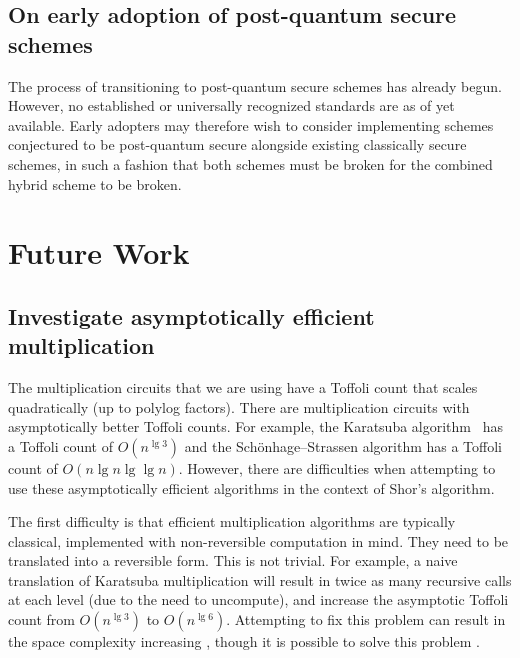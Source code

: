 \documentclass[superscriptaddress,notitlepage,longbibliography]{revtex4-1}
\theoremstyle{definition}
\theoremstyle{definition}
\begin{document}
\subsection{On early adoption of post-quantum secure schemes}
The process of transitioning to post-quantum secure schemes has already begun.
However, no established or universally recognized standards are as of yet available.
Early adopters may therefore wish to consider implementing schemes conjectured to be post-quantum secure  alongside existing classically secure schemes, in such a fashion that both schemes must be broken for the combined hybrid scheme to be broken.









\section{Future Work}
\label{sec:future-work}

\subsection{Investigate asymptotically efficient multiplication}

The multiplication circuits that we are using have a Toffoli count that scales quadratically (up to polylog factors).
There are multiplication circuits with asymptotically better Toffoli counts.
For example, the Karatsuba algorithm~\cite{karatsuba1962multiplication} has a Toffoli count of $O(n^{\lg 3})$ and the Schönhage–Strassen algorithm \cite{schonhage1971multiply} has a Toffoli count of $O(n \lg n \lg \lg n)$.
However, there are difficulties when attempting to use these asymptotically efficient algorithms in the context of Shor's algorithm.

The first difficulty is that efficient multiplication algorithms are typically classical, implemented with non-reversible computation in mind.
They need to be translated into a reversible form.
This is not trivial.
For example, a naive translation of Karatsuba multiplication will result in twice as many recursive calls at each level (due to the need to uncompute), and increase the asymptotic Toffoli count from $O(n^{\lg 3})$ to $O(n^{\lg 6})$.
Attempting to fix this problem can result in the space complexity increasing \cite{parent2017karatsuba}, though it is possible to solve this problem \cite{gidney2019karatsuba}.
\end{document}
